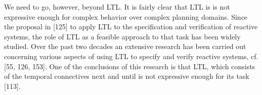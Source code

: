 








We need to go, however, beyond LTL. It is fairly clear that LTL is is not expressive enough for complex behavior over complex planning domains. Since the proposal in [125] to apply LTL to the specification and verification of reactive systems, the role of LTL as a feasible approach to that task has been widely studied. Over the past two decades an extensive research has been carried out concerning various aspects of using LTL to specify and verify reactive systems, cf. [55, 126, 153]. One of the conclusions of this research is that LTL, which consists of the temporal connectives next and until is not expressive enough for its task [113]. 


